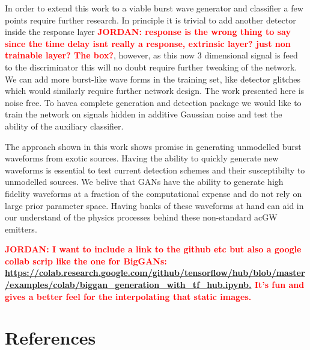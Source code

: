 \documentclass[12pt]{iopart}
\newcommand{\jordan}[1]{\textbf{\textcolor{red}{JORDAN: #1}}}
\begin{document}
In order to extend this work to a viable burst wave generator and classifier a few points require further research. In principle it is trivial to add another detector inside the response layer \jordan{response is the wrong thing to say since the time delay isnt really a response, extrinsic layer? just non trainable layer? The box?}, however, as this now 3 dimensional signal is feed to the discriminator this will no doubt require further tweaking of the network. We can add more burst-like wave forms in the training set, like detector glitches which would similarly require further network design. The work presented here is noise free. To havea complete generation and detection package we would like to train the network on signals hidden in additive Gaussian noise and test the ability of the auxiliary classifier. 

The approach shown in this work shows promise in generating unmodelled burst waveforms from exotic sources. Having the ability to quickly generate new waveforms is essential to test current detection schemes and their susceptibilty to unmodelled sources. We belive that GANs have the ability to generate high fidelity waveforms at a fraction of the computational expense and do not rely on large prior parameter space. Having banks of these waveforms at hand can aid in our understand of the physics processes behind these non-standard ac{GW} emitters.  

\jordan{I want to include a link to the github etc but also a google collab scrip like the one for BigGANs: \\
\url{https://colab.research.google.com/github/tensorflow/hub/blob/master/examples/colab/biggan_generation_with_tf_hub.ipynb.} 
It's fun and gives a better feel for the interpolating that static images.}

\section*{References}

\end{document}
